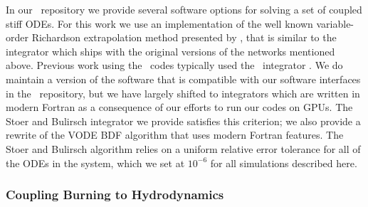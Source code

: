 \documentclass[12pt]{article}
\begin{document}
In our \microphysics\ repository we provide several software options for solving a set
of coupled stiff ODEs. For this work we use an implementation of the well known variable-order
Richardson extrapolation method presented by \citet{stoer:1980}, that is similar to the
integrator which ships with the original versions of the networks mentioned above.
Previous work using the \boxlib\ codes typically used the \vode\ integrator \citep{vode}.
We do maintain a version of the software that is compatible with our software interfaces
in the \microphysics\ repository, but we have largely shifted to integrators which are
written in modern Fortran as a consequence of our efforts to run our codes on GPUs.
The Stoer and Bulirsch integrator we provide satisfies this criterion; we also provide
a rewrite of the VODE BDF algorithm that uses modern Fortran features. The Stoer and
Bulirsch algorithm relies on a uniform relative error tolerance for all of the ODEs
in the system, which we set at $10^{-6}$ for all simulations described here.



\subsubsection{Coupling Burning to Hydrodynamics}
\label{sec:burnerhydrocoupling}
\end{document}
